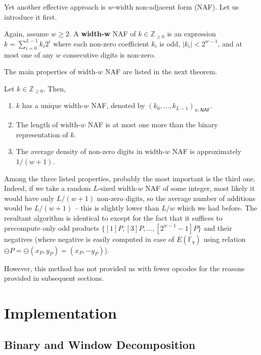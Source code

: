 \documentclass{iacrtrans}
\begin{document}
Yet another effective approach is $w$-width non-adjacent form (NAF). Let us introduce it first.

\begin{definition}
    Again, assume $w \geq 2$. A \textbf{width-w} NAF of $k \in \mathbb{Z}_{\geq 0}$ is an expression $k=\sum_{i=0}^{L-1}k_i2^i$ where each non-zero coefficient $k_i$ is odd, $|k_i| < 2^{w-1}$, and at most one of any $w$ consecutive digits is non-zero.
\end{definition}

The main properties of width-$w$ NAF are listed in the next theorem.

\begin{theorem}
    Let $k \in \mathbb{Z}_{\geq 0}$. Then,
    \begin{enumerate}
        \item $k$ has a unique width-$w$ NAF, denoted by $(k_0,\dots,k_{L-1})_{w,\mathsf{NAF}}$.
        \item The length of width-$w$ NAF is at most one more than the binary representation of $k$.
        \item The average density of non-zero digits in width-$w$ NAF is approximately $1/(w+1)$.
    \end{enumerate}
\end{theorem}


Among the three listed properties, probably the most important is the third one. Indeed, if we take a random $L$-sized width-$w$ NAF of some integer, most likely it would have only $L/(w+1)$ non-zero digits, so the average number of additions would be $L/(w+1)$ -- this is slightly lower than $L/w$ which we had before. The resultant algorithm is identical to  except for the fact that it suffices to precompute only odd products $\{[1]P,[3]P,\dots,[2^{w-1}-1]P\}$ and their negatives (where negative is easily computed in case of $E(\mathbb{F}_q)$ using relation $\ominus P = \ominus(x_P,y_P) = (x_P,-y_P)$). 

However, this method has not provided us with fewer opcodes for the reasons provided in subsequent sections.

\section{Implementation}\label{section:implementation}

\subsection{Binary and Window Decomposition}
\end{document}
